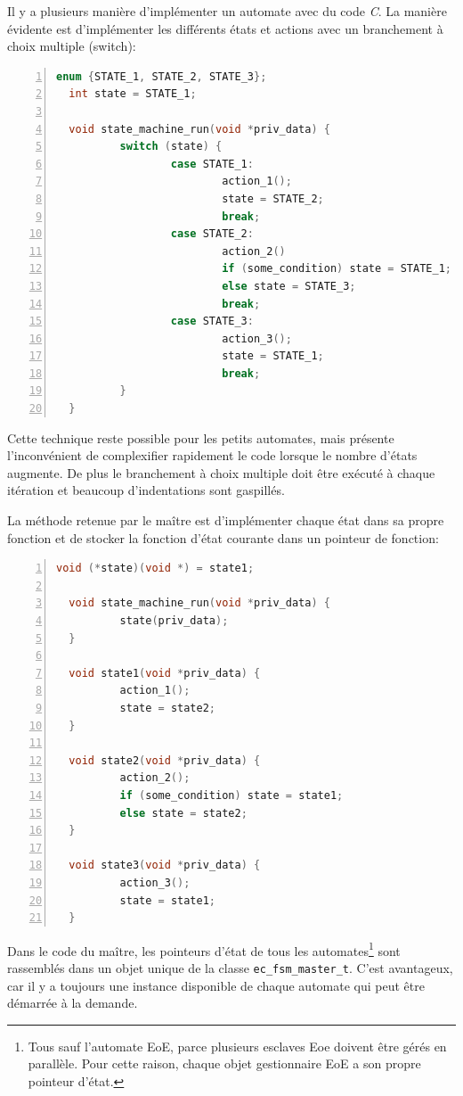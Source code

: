 \documentclass[a4paper,12pt,BCOR6mm,bibtotoc,idxtotoc]{scrbook}
\begin{document}
Il y a plusieurs mani\`ere d'impl\'ementer un automate avec du code
\textit{C}.  La mani\`ere \'evidente est d'impl\'ementer les
diff\'erents \'etats et actions avec un branchement \`a choix multiple
(switch):

\begin{lstlisting}[gobble=2,language=C,numbers=left]
  enum {STATE_1, STATE_2, STATE_3};
  int state = STATE_1;

  void state_machine_run(void *priv_data) {
          switch (state) {
                  case STATE_1:
                          action_1();
                          state = STATE_2;
                          break;
                  case STATE_2:
                          action_2()
                          if (some_condition) state = STATE_1;
                          else state = STATE_3;
                          break;
                  case STATE_3:
                          action_3();
                          state = STATE_1;
                          break;
          }
  }
\end{lstlisting}

Cette technique reste possible pour les petits automates, mais
pr\'esente l'inconv\'enient de complexifier rapidement le code lorsque
le nombre d'\'etats augmente. De plus le branchement \`a choix
multiple doit \^etre ex\'ecut\'e \`a chaque it\'eration et beaucoup
d'indentations sont gaspill\'es.

La m\'ethode retenue par le ma\^itre est d'impl\'ementer chaque \'etat
dans sa propre fonction et de stocker la fonction d'\'etat courante
dans un pointeur de fonction:

\begin{lstlisting}[gobble=2,language=C,numbers=left]
  void (*state)(void *) = state1;

  void state_machine_run(void *priv_data) {
          state(priv_data);
  }

  void state1(void *priv_data) {
          action_1();
          state = state2;
  }

  void state2(void *priv_data) {
          action_2();
          if (some_condition) state = state1;
          else state = state2;
  }

  void state3(void *priv_data) {
          action_3();
          state = state1;
  }
\end{lstlisting}

Dans le code du ma\^itre, les pointeurs d'\'etat de tous les
automates\footnote{Tous sauf l'automate EoE, parce plusieurs esclaves
  Eoe doivent \^etre g\'er\'es en parall\`ele.  Pour cette raison,
  chaque objet gestionnaire EoE a son propre pointeur d'\'etat.}  sont
rassembl\'es dans un objet unique de la classe
\lstinline+ec_fsm_master_t+.  C'est avantageux, car il y a toujours
une instance disponible de chaque automate qui peut \^etre d\'emarr\'ee
\`a la demande.
\end{document}
